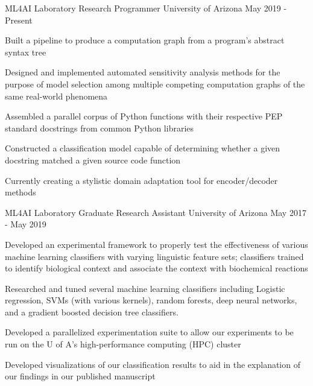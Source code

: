

\begin{cventries}

  \cventry
    {ML4AI Laboratory} %
    {Research Programmer} %
    {University of Arizona} %
    {May 2019 - Present} %
    {
      \begin{cvitems} %
        \item Built a pipeline to produce a computation graph from a program’s abstract syntax tree
        \item Designed and implemented automated sensitivity analysis methods for the purpose of model selection among multiple competing computation graphs of the same real-world phenomena
        \item Assembled a parallel corpus of Python functions with their respective PEP standard docstrings from common Python libraries
        \item Constructed a classification model capable of determining whether a given docstring matched a given source code function
        \item Currently creating a stylistic domain adaptation tool for encoder/decoder methods
      \end{cvitems}
    }

  \cventry
    {ML4AI Laboratory} %
    {Graduate Research Assistant} %
    {University of Arizona} %
    {May 2017 - May 2019} %
    {
      \begin{cvitems} %
        \item Developed an experimental framework to properly test the effectiveness of various machine learning classifiers with varying linguistic feature sets; classifiers trained to identify biological context and associate the context with biochemical reactions
        \item Researched and tuned several machine learning classifiers including Logistic regression, SVMs (with various kernels), random forests, deep neural networks, and a gradient boosted decision tree classifiers.
        \item Developed a parallelized experimentation suite to allow our experiments to be run on the U of A’s high-performance computing (HPC) cluster
        \item Developed visualizations of our classification results to aid in the explanation of our findings in our published manuscript
      \end{cvitems}
    }


\end{cventries}
